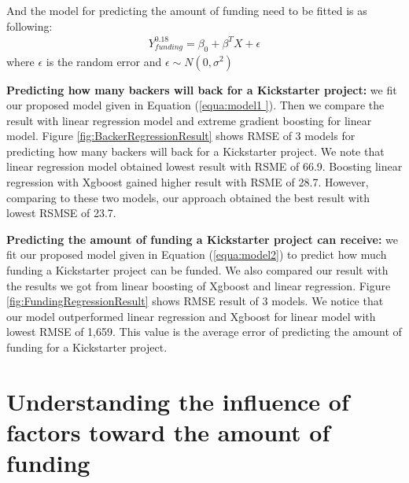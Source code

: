 And the model for predicting the amount of funding need to be fitted is as following:
\begin{equation}
\label{equa:model2}
\begin{aligned}
	Y_{funding}^{0.18} = \beta_0 + \beta^TX + \epsilon
\end{aligned}
\end{equation}
where $\epsilon$ is the random error and $\epsilon\sim N(0, \sigma^2)$ 

\textbf{Predicting how many backers will back for a Kickstarter project:} we fit our proposed model given in Equation (\ref{equa:model1 }). Then we compare the result with linear regression model and extreme gradient boosting for linear model. Figure \ref{fig:BackerRegressionResult} shows RMSE of 3 models for predicting how many backers will back for a Kickstarter project. We note that linear regression model obtained lowest result with RSME of 66.9. Boosting linear regression with Xgboost gained higher result with RSME of 28.7. However, comparing to these two models, our approach obtained the best result with lowest RSMSE of 23.7.


\textbf{Predicting the amount of funding a Kickstarter project can receive:} we fit our proposed model given in Equation (\ref{equa:model2}) to predict how much funding a Kickstarter project can be funded. We also compared our result with the results we got from linear boosting of Xgboost and linear regression. Figure \ref{fig:FundingRegressionResult} shows RMSE result of 3 models. We notice that our model outperformed linear regression and Xgboost for linear model with lowest RMSE of 1,659. This value is the average error of predicting the amount of funding for a Kickstarter project. 


\section{Understanding the influence of factors toward the amount of funding}